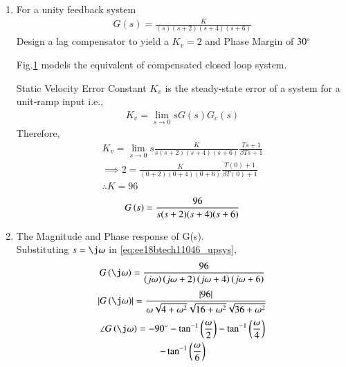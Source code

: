 \begin{enumerate}[label=\thesection.\arabic*.,ref=\thesection.\theenumi]
\item For a unity feedback system 
\begin{align}
G(s) = \frac{K}{(s)(s+2)(s+4)(s+6)}
\label{eq:ee18btech11046_system}
\end{align}
Design a lag compensator to yield a $K_{v}=2$ and Phase Margin of $30\degree$


\solution
%
\solution Fig.\ref{fig:ee18btech11046_flow} models the equivalent of compensated closed loop system. 
 \begin{figure}[!ht]
	\begin{center}
		\resizebox{\columnwidth}{!}{}
	\end{center}
\caption{}
\label{fig:ee18btech11046_flow}
\end{figure}

%
Static Velocity Error Constant $K_{v}$ is the steady-state error of a system for a unit-ramp input i.e.,
\begin{align}
K_{v}=\lim _{s \rightarrow 0} s G(s) G_{c}(s)
\label{eq:ee18btech11046_compansatedsys}
\end{align}
Therefore,
\begin{multline}
K_{v}=\lim _{s \rightarrow 0} s \frac{K}{s(s+2)(s+4)(s+6)} \frac{Ts+1}{\beta Ts+1}
\\
\implies 
2 = \frac{K}{(0+2)(0+4)(0+6)} \frac{T(0)+1}{\beta T(0)+1}
\\
\therefore 
K = 96
\end{multline}
\begin{align}
G\left(s\right)=\frac{96}{s(s+2)(s+4)(s+6)}
\label{eq:ee18btech11046_upsys}
\end{align}


\item The Magnitude and Phase response of G(s).\\
\solution Substituting $s = \j\omega$ in \eqref{eq:ee18btech11046_upsys},
\begin{multline}
G\brak{\j\omega} =\frac{96}{\brak{j\omega}\brak{j\omega+2}\brak{j\omega+4}\brak{j\omega+6}} 
\end{multline}
\begin{multline}
\abs{G\brak{\j\omega}} = \frac{\abs{96}}{\omega\sqrt{4+\omega^2}\sqrt{16+\omega^2}\sqrt{36+\omega^2}}
\label{eq:ee18btech11046_gain}
\end{multline}
\begin{multline}
\angle G\brak{\j\omega} = -90\degree -\tan^{-1}\brak{\frac{\omega}{2}}  - \tan^{-1}\brak{\frac{\omega}{4}} \\-  \tan^{-1}\brak{\frac{\omega}{6}} 
\label{eq:ee18btech11046_phase}
\end{multline}


\end{enumerate}

